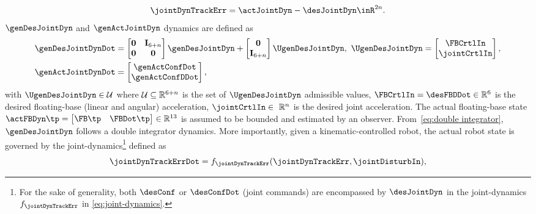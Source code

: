 \begin{align}\label{eq:jointDyn tracking error}
	\begin{split}
		\jointDynTrackErr = \actJointDyn - \desJointDyn\inR^{2n}.
	\end{split}	
\end{align} 
$\genDesJointDyn$ and $\genActJointDyn$ dynamics are defined as
\begin{align}\label{eq:double integrator}
	\genDesJointDynDot &=
	\begin{bmatrix}
		\mathbf{0} & \mathbf{I}_{6+n} \\
		\mathbf{0} & \mathbf{0}
	\end{bmatrix}
	\genDesJointDyn + 
	\begin{bmatrix}
		\mathbf{0} \\
		\mathbf{I}_{6+n}
	\end{bmatrix} \UgenDesJointDyn, \ \UgenDesJointDyn = \begin{bmatrix}
		\FBCrtlIn \\ \jointCrtlIn
	\end{bmatrix}, \\
	\label{eq:robot dynamics}\genActJointDynDot &= \begin{bmatrix}
		\genActConfDot\\ \genActConfDDot
	\end{bmatrix},
\end{align}
with  $\UgenDesJointDyn\in {\cal U}$ where ${\cal U}\subseteq\mathbb{R}^{6+n}$ is the set of $\UgenDesJointDyn$ admissible values, $\FBCrtlIn=\desFBDDot\in\mathbb{R}^6$ is the desired floating-base (linear and angular) acceleration,  $\jointCrtlIn \in\ \mathbb{R}^n$ is the desired joint acceleration.   	The actual floating-base state ${\actFBDyn}\tp=\begin{bmatrix}
	{\FB}\tp & {\FBDot}\tp
\end{bmatrix}\in \mathbb{R}^{13}$ 
is assumed to be bounded and estimated by an observer. From~\cref{eq:double integrator}, $\genDesJointDyn$ follows a double integrator dynamics. More importantly, given a kinematic-controlled robot, the actual robot state is governed  by the joint-dynamics\footnote{For the sake of generality, both $\desConf$ or $\desConfDot$ (joint commands) are encompassed by $\desJointDyn$ in the joint-dynamics $f_{\jointDynTrackErr}$ in \cref{eq:joint-dynamics}.} defined as 
\begin{equation}\label{eq:joint-dynamics}
\jointDynTrackErrDot = f_{\jointDynTrackErr}(\jointDynTrackErr,\jointDisturbIn),
\end{equation}   

